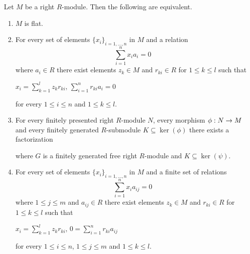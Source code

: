 \begin{theorem}\label{theorem:equationalcriteria}
Let $M$ be a right $R$-module. Then the following are equivalent.
\begin{enumerate}[label=\emph{\textbf{(\roman*)}}, leftmargin=3.0em]
\item $M$ is flat.
\item For every set of elements $\{x_i\}_{i=1,...,n}$ in $M$ and a relation
$$\sum^n_{i=1}x_ia_{i}=0$$
where $a_{i}\in R$ there exist elements $z_k\in M$ and $r_{ki}\in R$ for $1\leq k\leq l$ such that
\begin{center}
$x_i=\sum^l_{k=1}z_kr_{ki}$, $\sum^n_{i=1}r_{ki}a_{i}=0$
\end{center}
for every $1\leq i \leq n$ and $1\leq k\leq l$.
\item For every finitely presented right $R$-module $N$, every morphism $\phi:N\rightarrow M$ and every finitely generated $R$-submodule $K\subseteq \ker(\phi)$ there exists a factorization
\begin{center}
\end{center}
where $G$ is a finitely generated free right $R$-module and $K\subseteq \ker(\psi)$.
\item For every set of elements $\{x_i\}_{i=1,...,n}$ in $M$ and a finite set of relations
$$\sum^n_{i=1}x_ia_{ij}=0$$
where $1\leq j\leq m$ and $a_{ij}\in R$ there exist elements $z_k\in M$ and $r_{ki}\in R$ for $1\leq k\leq l$ such that
\begin{center}
$x_i=\sum^l_{k=1}z_kr_{ki}$, $0=\sum^n_{i=1}r_{ki}a_{ij}$
\end{center}
for every $1\leq i \leq n$, $1\leq j\leq m$ and $1\leq k\leq l$.
\end{enumerate}
\end{theorem}
